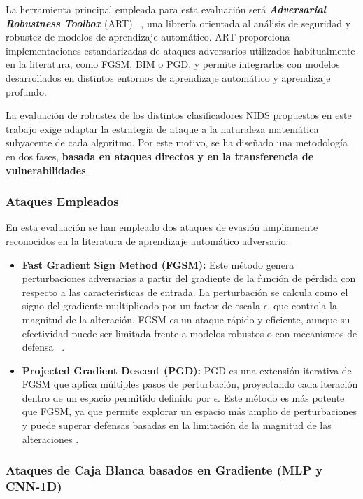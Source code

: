 La herramienta principal empleada para esta evaluación será \textbf{\textit{Adversarial Robustness Toolbox}} (ART) ~\cite{art}, una librería orientada al análisis de seguridad y robustez de modelos de aprendizaje automático. ART proporciona implementaciones estandarizadas de ataques adversarios utilizados habitualmente en la literatura, como FGSM, BIM o PGD, y permite integrarlos con modelos desarrollados en distintos entornos de aprendizaje automático y aprendizaje profundo.

La evaluación de robustez de los distintos clasificadores NIDS propuestos en este trabajo exige adaptar la estrategia de ataque a la naturaleza matemática subyacente de cada algoritmo. Por este motivo, se ha diseñado una metodología en dos fases, \textbf{basada en ataques directos y en la transferencia de vulnerabilidades}.

\subsubsection{Ataques Empleados}

En esta evaluación se han empleado dos ataques de evasión ampliamente reconocidos en la literatura de aprendizaje automático adversario:
\begin{itemize}
    \item \textbf{Fast Gradient Sign Method (FGSM):} Este método genera perturbaciones adversarias a partir del gradiente de la función de pérdida con respecto a las características de entrada. La perturbación se calcula como el signo del gradiente multiplicado por un factor de escala $\epsilon$, que controla la magnitud de la alteración. FGSM es un ataque rápido y eficiente, aunque su efectividad puede ser limitada frente a modelos robustos o con mecanismos de defensa ~\cite{FGSM}.
    
    \item \textbf{Projected Gradient Descent (PGD):} PGD es una extensión iterativa de FGSM que aplica múltiples pasos de perturbación, proyectando cada iteración dentro de un espacio permitido definido por $\epsilon$. Este método es más potente que FGSM, ya que permite explorar un espacio más amplio de perturbaciones y puede superar defensas basadas en la limitación de la magnitud de las alteraciones \cite{PGD}.
\end{itemize}

\subsubsection{Ataques de Caja Blanca basados en Gradiente (MLP y CNN-1D)}

